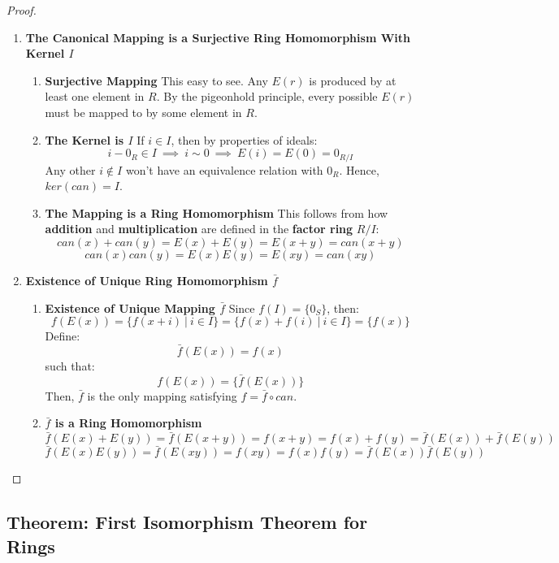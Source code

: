 \documentclass{exam}
\begin{document}
\begin{proof}

\begin{enumerate}
    \item \textbf{The Canonical Mapping is a Surjective Ring Homomorphism With Kernel $I$}
    \begin{enumerate}
        \item \textbf{Surjective Mapping}
        This easy to see. Any $E(r)$ is produced by at least one element in $R$. By the pigeonhold principle, every possible $E(r)$ must be mapped to by some element in $R$.
        \item \textbf{The Kernel is $I$} If $i \in I$, then by properties of ideals:    
        \[
        i - 0_R \in I \ \implies \ i \sim 0 \ \implies \ E(i) = E(0) = 0_{R/I}
        \]
        Any other $i \not\in I$ won't have an equivalence relation with $0_R$. Hence, $ker(can) = I$.
        \item \textbf{The Mapping is a Ring Homomorphism} This follows from how \textbf{addition} and \textbf{multiplication} are defined in the \textbf{factor ring} $R/I$:
        \[
        can(x) + can(y) = E(x) + E(y) = E(x + y) = can(x+y)
        \]
        \[
        can(x)can(y) = E(x)E(y) = E(xy) = can(xy)
        \]
    \end{enumerate}
    \item \textbf{Existence of Unique Ring Homomorphism $\bar{f}$}
    \begin{enumerate}
        \item \textbf{Existence of Unique Mapping $\bar{f}$}
        Since $f(I) = \{0_S\}$, then:
        \[
        f(E(x)) = \{f(x + i) \ | \ i \in I\} = \{f(x) + f(i) \ | \ i \in I\} = \{f(x)\}
        \]
        Define:
        \[
        \bar{f}(E(x)) = f(x)
        \]
        such that:
        \[
        f(E(x)) = \{\bar{f}(E(x))\}
        \]
        Then, $\bar{f}$ is the only mapping satisfying $f = \bar{f} \circ can$.
        \item \textbf{$\bar{f}$ is a Ring Homomorphism}
        \[
        \bar{f}(E(x) + E(y)) = \bar{f}(E(x+y)) = f(x+y) = f(x) + f(y) = \bar{f}(E(x)) + \bar{f}(E(y))
        \]
        \[
        \bar{f}(E(x)E(y)) = \bar{f}(E(xy)) = f(xy) = f(x)f(y) = \bar{f}(E(x))\bar{f}(E(y))
        \]
    \end{enumerate}
\end{enumerate}

\end{proof}


\subsection{Theorem: First Isomorphism Theorem for Rings}
\end{document}
